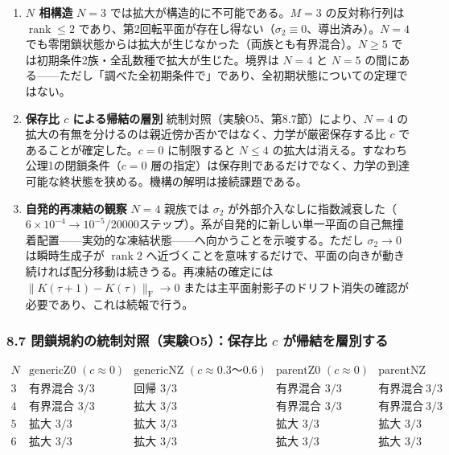 \documentclass[
  a4paper,
]{ltjsarticle}
\providecommand{\tightlist}{%
  \setlength{\itemsep}{0pt}\setlength{\parskip}{0pt}}
\begin{document}
\begin{enumerate}
\def\labelenumi{\arabic{enumi}.}
\tightlist
\item
  \textbf{\(N\) 相構造} \(N=3\) では拡大が構造的に不可能である。\(M=3\)
  の反対称行列は \(\operatorname{rank}\le2\)
  であり、第2回転平面が存在し得ない（\(\sigma_2\equiv0\)、導出済み）。\(N=4\)
  でも零閉鎖状態からは拡大が生じなかった（両族とも有界混合）。\(N\ge5\)
  では初期条件2族・全乱数種で拡大が生じた。境界は \(N=4\) と \(N=5\)
  の間にある------ただし「調べた全初期条件で」であり、全初期状態についての定理ではない。
\item
  \textbf{保存比 \(c\) による帰結の層別}
  統制対照（実験O5、第8.7節）により、\(N=4\)
  の拡大の有無を分けるのは親近傍か否かではなく、力学が厳密保存する比
  \(c\) であることが確定した。\(c=0\) に制限すると \(N\le4\)
  の拡大は消える。すなわち公理1の閉鎖条件（\(c=0\)
  層の指定）は保存則であるだけでなく、力学の到達可能な終状態を狭める。機構の解明は接続課題である。
\item
  \textbf{自発的再凍結の観察} \(N=4\) 親族では \(\sigma_2\)
  が外部介入なしに指数減衰した（\(6\times10^{-4}\to10^{-5}\)/20000ステップ）。系が自発的に新しい単一平面の自己無撞着配置------実効的な凍結状態------へ向かうことを示唆する。ただし
  \(\sigma_2\to0\) は瞬時生成子が \(\operatorname{rank}2\)
  へ近づくことを意味するだけで、平面の向きが動き続ければ配分移動は続きうる。再凍結の確定には
  \(\lVert K(\tau{+}1)-K(\tau)\rVert_{\mathrm F}\to0\)
  または主平面射影子のドリフト消失の確認が必要であり、これは続報で行う。
\end{enumerate}

\subsubsection{\texorpdfstring{8.7 閉鎖規約の統制対照（実験O5）：保存比
\(c\)
が帰結を層別する}{8.7 閉鎖規約の統制対照（実験O5）：保存比 c が帰結を層別する}}\label{ux9589ux9396ux898fux7d04ux306eux7d71ux5236ux5bfeux7167ux5b9fux9a13o5ux4fddux5b58ux6bd4-c-ux304cux5e30ux7d50ux3092ux5c64ux5225ux3059ux308b}

\[
\begin{array}{c|cccc}
N & \text{genericZ0 }(c\approx0) & \text{genericNZ }(c\approx0.3\text{〜}0.6) & \text{parentZ0 }(c\approx0) & \text{parentNZ}\\\hline
3 & \text{有界混合 }3/3 & \textbf{回帰 }3/3 & \text{有界混合 }3/3 & \text{有界混合 }3/3\\
4 & \text{有界混合 }3/3 & \textbf{拡大 }3/3 & \text{有界混合 }3/3 & \text{有界混合 }3/3\\
5 & \text{拡大 }3/3 & \text{拡大 }3/3 & \text{拡大 }3/3 & \text{拡大 }3/3\\
6 & \text{拡大 }3/3 & \text{拡大 }3/3 & \text{拡大 }3/3 & \text{拡大 }3/3
\end{array}
\]
\end{document}
